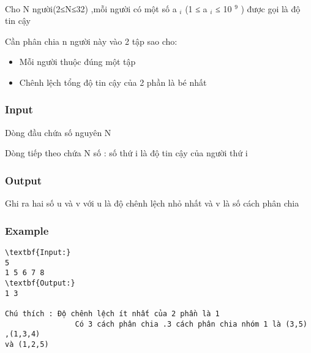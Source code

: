 

 

Cho N người(2≤N≤32) ,mỗi người có một số a $_ i $ (1 ≤ a $_ i $ ≤ 10 $^ 9 $ ) được gọi là độ tin cậy

Cần phân chia n người này vào 2 tập sao cho:
\begin{itemize}
	\item Mỗi người thuộc đúng một tập
	\item Chênh lệch tổng độ tin cậy của 2 phần là bé nhất
\end{itemize}

\subsubsection{Input}

Dòng đầu chứa số nguyên N

Dòng tiếp theo chứa N số : số thứ i là độ tin cậy của người thứ i

\subsubsection{Output}

Ghi ra hai số u và v với u là độ chênh lệch nhỏ nhất và v là số cách phân chia

\subsubsection{Example}
\begin{verbatim}
\textbf{Input:}
5 
1 5 6 7 8
\textbf{Output:}
1 3

Chú thích : Độ chênh lệch ít nhất của 2 phần là 1
                Có 3 cách phân chia .3 cách phân chia nhóm 1 là (3,5) ,(1,3,4) 
và (1,2,5)

\end{verbatim}